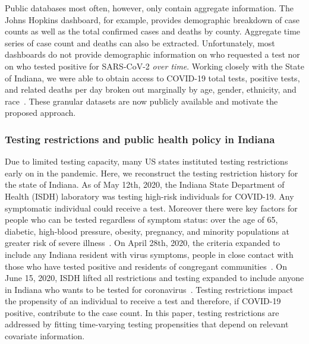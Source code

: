 \documentclass[11pt]{amsart}
\numberwithin{equation}{section}
\theoremstyle{plain}
\begin{document}
Public databases most often, however, only contain aggregate information.  The Johns Hopkins dashboard, for example, provides demographic breakdown of case counts as well as the total confirmed cases and deaths by county.  Aggregate time series of case count and deaths can also be extracted.  Unfortunately, most dashboards do not provide demographic information on who requested a test nor on who tested positive for SARS-CoV-2 \emph{over time}. Working closely with the State of Indiana, we were able to obtain access to COVID-19 total tests, positive tests, and related deaths per day broken out marginally by age, gender, ethnicity, and race~\citep{IndianaData2021}.  These granular datasets are now publicly available and motivate the proposed approach.
%




\subsubsection{Testing restrictions and public health policy in Indiana}
\label{section:publicpolicyindiana}

Due to limited testing capacity, many US states instituted testing restrictions early on in the pandemic.
Here, we reconstruct the testing restriction history for the state of Indiana. As of May 12th, 2020, the Indiana State Department of Health (ISDH) laboratory was testing high-risk individuals for COVID-19. Any symptomatic individual could receive a test.  Moreover there were key factors for people who can be tested regardless of symptom status: over the age of 65, diabetic, high-blood pressure, obesity, pregnancy, and minority populations at greater risk of severe illness~\citep{indystar2020}.
On April 28th, 2020, the criteria expanded to include any Indiana resident with virus symptoms, people in close contact with those who have tested positive and residents of congregant communities~\citep{wishtv2020}.
On June 15, 2020, ISDH lifted all restrictions and testing expanded to include anyone in Indiana who wants to be tested for coronavirus~\citep{indystar2020v2}.
Testing restrictions impact the propensity of an individual to receive a test and therefore, if COVID-19 positive, contribute to the case count.  In this paper, testing restrictions are addressed by fitting time-varying testing propensities that depend on relevant covariate information.
\end{document}
